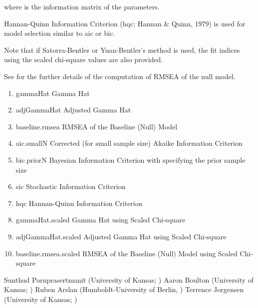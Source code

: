 \documentclass[a4paper]{book}
\begin{document}
\begin{Details}

where  is the information matrix of the parameters.

Hannan-Quinn Information Criterion (hqc; Hannan \& Quinn, 1979) is used for model selection similar to aic or bic.


Note that if Satorra-Bentler or Yuan-Bentler's method is used, the fit indices using the scaled chi-square values are also provided. 

See  for the further details of the computation of RMSEA of the null model.
\end{Details}
%
\begin{Value}
\begin{enumerate}

\item gammaHat Gamma Hat
\item adjGammaHat Adjusted Gamma Hat
\item baseline.rmsea RMSEA of the Baseline (Null) Model
\item aic.smallN Corrected (for small sample size) Akaike Information Criterion
\item bic.priorN Bayesian Information Criterion with specifying the prior sample size
\item sic Stochastic Information Criterion
\item hqc Hannan-Quinn Information Criterion
\item gammaHat.scaled Gamma Hat using Scaled Chi-square
\item adjGammaHat.scaled Adjusted Gamma Hat using Scaled Chi-square
\item baseline.rmsea.scaled RMSEA of the Baseline (Null) Model using Scaled Chi-square

\end{enumerate}

\end{Value}
%
\begin{Author}\relax
Sunthud Pornprasertmanit (University of Kansas; )
Aaron Boulton (University of Kansas; )
Ruben Arslan (Humboldt-University of Berlin, )
Terrence Jorgensen (University of Kansas; )
\end{Author}
%
\end{document}
